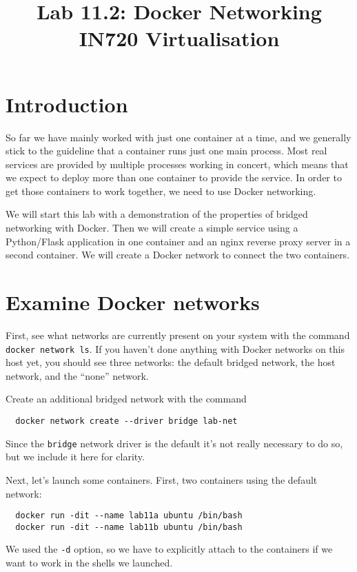 \documentclass{article}
\begin{document}
\title{Lab 11.2: Docker Networking\\IN720 Virtualisation}
\date{}
\maketitle

\section*{Introduction}
So far we have mainly worked with just one container at a time, and we generally stick to the guideline that a container runs just one main process. Most real services are provided by multiple processes working in concert, which means that we expect to deploy more than one container to provide the service. In order to get those containers to work together, we need to use Docker networking.

We will start this lab with a demonstration of the properties of bridged networking with Docker. Then we will create a simple service using a Python/Flask application in one container and an nginx reverse proxy server in a second container. We will create a Docker network to connect the two containers.
\section{Examine Docker networks}
First, see what networks are currently present on your system with the command \texttt{docker network ls}. If you haven't done anything with Docker networks on this host yet, you should see three networks: the default bridged network, the host network, and the ``none'' network. 

Create an additional bridged network with the command 

\begin{verbatim}
  docker network create --driver bridge lab-net
\end{verbatim}

Since the \texttt{bridge} network driver is the default it's not really necessary to do so, but we include it here for clarity.

Next, let's launch some containers. First, two containers using the default network:

\begin{verbatim}
  docker run -dit --name lab11a ubuntu /bin/bash
  docker run -dit --name lab11b ubuntu /bin/bash
\end{verbatim} 

We used the \texttt{-d} option, so we have to explicitly attach to the containers if we want to work in the shells we launched.
\end{document}
